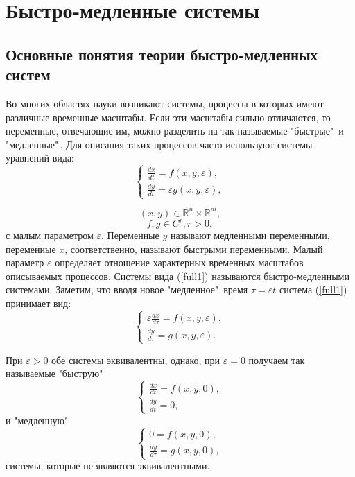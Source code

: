 \section{Быстро-медленные системы}
\subsection{Основные понятия теории быстро-медленных систем}

Во многих областях науки возникают системы, процессы в которых имеют различные временные масштабы. Если эти масштабы сильно отличаются, то переменные, отвечающие им, можно разделить на так называемые "быстрые"\, и "медленные"\,. Для описания таких процессов часто используют системы уравнений вида:
\begin{equation}
\begin{cases}
    \frac{dx}{dt} = f(x,y,\varepsilon) ,\\
    \frac{dy}{dt} = \varepsilon g(x,y,\varepsilon),
\end{cases}
\label{full1}
\end{equation}

$$(x,y) \in \mathbb{R}^n \times \mathbb{R}^m,$$
$$f,g \in C^r, r>0,$$
с малым параметром $\varepsilon$. Переменные $y$ называют медленными переменными, переменные $x$, соответственно, называют быстрыми переменными. Малый параметр 
$\varepsilon$ определяет отношение характерных временных масштабов описываемых процессов. Системы вида (\ref{full1}) называются быстро-медленными системами.
Заметим, что вводя новое "медленное"\, время $\tau = \varepsilon t$ система (\ref{full1}) принимает вид:
\begin{equation}
\begin{cases}
    \varepsilon \frac{dx}{d \tau} = f(x,y,\varepsilon), \\
    \frac{dy}{d \tau} = g(x,y,\varepsilon).
\end{cases}
\label{full2}
\end{equation}

При $\varepsilon>0$ обе системы эквивалентны, однако, при $\varepsilon = 0$ получаем так называемые "быструю"\,
\begin{equation}
\begin{cases}
    \frac{dx}{dt} = f(x,y,0), \\
    \frac{dy}{dt} = 0,
\end{cases}
\label{fast}
\end{equation}
и "медленную"\,
\begin{equation}
\begin{cases}
    0 = f(x,y,0), \\
    \frac{dy}{d \tau} = g(x,y,0),
\end{cases}
\label{slow}
\end{equation}
системы, которые не являются эквивалентными.

